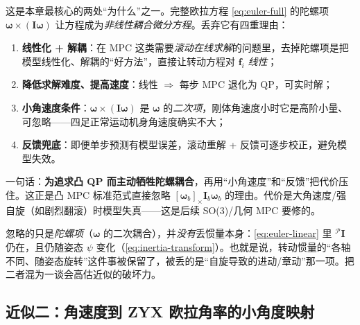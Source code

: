 \begin{insight}\label{ins:drop-gyro}
这是本章最核心的两处“为什么”之一。完整欧拉方程 \cref{eq:euler-full} 的陀螺项 $\boldsymbol{\omega}\times(\mathbf{I}\boldsymbol{\omega})$ 让方程成为\emph{非线性耦合微分方程}。丢弃它有四重理由：
\begin{enumerate}
  \item \textbf{线性化 + 解耦}：在 MPC 这类需要\emph{滚动在线求解}的问题里，去掉陀螺项是把模型线性化、解耦的“好方法”，直接让转动方程对 $\mathbf{f}_i$ \emph{线性}；
  \item \textbf{降低求解难度、提高速度}：线性 $\Rightarrow$ 每步 MPC 退化为 QP，可实时解；
  \item \textbf{小角速度条件}：$\boldsymbol{\omega}\times(\mathbf{I}\boldsymbol{\omega})$ 是 $\boldsymbol{\omega}$ 的\emph{二次项}，刚体角速度小时它是高阶小量、可忽略——四足正常运动机身角速度确实不大；
  \item \textbf{反馈兜底}：即便单步预测有模型误差，滚动重解 + 反馈可逐步校正，避免模型失效。
\end{enumerate}
一句话：\textbf{为追求凸 QP 而主动牺牲陀螺耦合}，再用“小角速度”和“反馈”把代价压住。这正是凸 MPC 标准范式直接忽略 $[\boldsymbol{\omega}_b]_\times\mathbf{I}_b\boldsymbol{\omega}_b$ 的理由\cite{dicarlo2018cheetah,unitree2023quadruped}。代价是大角速度/强自旋（如剧烈翻滚）时模型失真——这是后续 SO(3)/几何 MPC\cite{ding2021repfree} 要修的。
\end{insight}

\begin{pitfall}[误区：以为“线性化欧拉方程 = 丢了惯量耦合的全部”]
忽略的只是\emph{陀螺项}（$\boldsymbol{\omega}$ 的二次耦合），并\emph{没有}丢惯量本身：\cref{eq:euler-linear} 里 ${}^{\mathcal{P}}\mathbf{I}$ 仍在，且仍随姿态 $\psi$ 变化（\cref{eq:inertia-transform}）。也就是说，转动惯量的“各轴不同、随姿态旋转”这件事被保留了，被丢的是“自旋导致的进动/章动”那一项。把二者混为一谈会高估近似的破坏力。
\end{pitfall}

\subsection{近似二：角速度到 ZYX 欧拉角率的小角度映射}
\label{subsec:euler-map}

